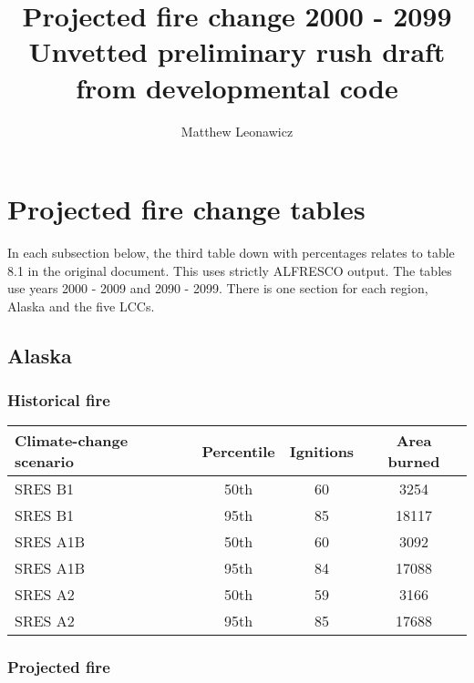 \documentclass{article}\usepackage[]{graphicx}\usepackage[]{color}
\newcommand{\headcol}{\rowcolor{tableheadcolor}}
\begin{document}
\title{Projected fire change 2000 - 2099 \\ \large Unvetted preliminary rush draft from developmental code}
\author{Matthew Leonawicz}
\maketitle

\setlength{\aboverulesep}{0.2pt}
\setlength{\belowrulesep}{0.2pt}



\section{Projected fire change tables}
In each subsection below, the third table down with percentages relates to table 8.1 in the original document.
This uses strictly ALFRESCO output.
The tables use years 2000 - 2009 and 2090 - 2099.
There is one section for each region, Alaska and the five LCCs.


\subsection{Alaska}
\subsubsection{Historical fire}

\begin{table}[ht]
\centering
\begin{tabular}{lccc}
  \headcol 
 \toprule
Climate-change scenario & Percentile & Ignitions & Area burned \\ 
  \midrule
SRES B1 & 50th & 60 & 3254 \\ 
  SRES B1 & 95th & 85 & 18117 \\ 
  SRES A1B & 50th & 60 & 3092 \\ 
  SRES A1B & 95th & 84 & 17088 \\ 
  SRES A2 & 50th & 59 & 3166 \\ 
  SRES A2 & 95th & 85 & 17688 \\ 
   \bottomrule
\end{tabular}
\end{table}


\subsubsection{Projected fire}
\end{document}

